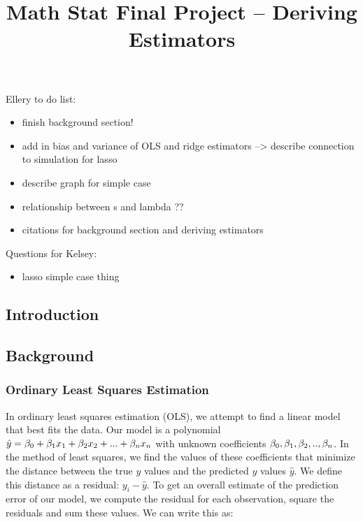 \documentclass[
]{article}
\title{Math Stat Final Project -- Deriving Estimators}
\author{}
\date{\vspace{-2.5em}}
\providecommand{\tightlist}{%
  \setlength{\itemsep}{0pt}\setlength{\parskip}{0pt}}
\begin{document}
\maketitle

Ellery to do list:

\begin{itemize}
\tightlist
\item
  finish background section!
\item
  add in bias and variance of OLS and ridge estimators --\textgreater{}
  describe connection to simulation for lasso
\item
  describe graph for simple case
\item
  relationship between s and lambda ??
\item
  citations for background section and deriving estimators
\end{itemize}

Questions for Kelsey:

\begin{itemize}
\tightlist
\item
  lasso simple case thing
\end{itemize}

\hypertarget{introduction}{%
\subsection{Introduction}\label{introduction}}

\hypertarget{background}{%
\subsection{Background}\label{background}}

\hypertarget{ordinary-least-squares-estimation}{%
\subsubsection{Ordinary Least Squares
Estimation}\label{ordinary-least-squares-estimation}}

In ordinary least squares estimation (OLS), we attempt to find a linear
model that best fits the data. Our model is a polynomial
\(\hat{y} = \beta_0 +\beta_1x_1 + \beta_2x_2 + \space ... \space + \beta_nx_n\)
with unknown coefficients
\(\beta_0, \space \beta_1, \space \beta_2, \space .., \space \beta_n\).
In the method of least squares, we find the values of these coefficients
that minimize the distance between the true \(y\) values and the
predicted \(y\) values \(\hat{y}\). We define this distance as a
residual: \(y_i- \hat{y}\). To get an overall estimate of the prediction
error of our model, we compute the residual for each observation, square
the residuals and sum these values. We can write this as:
\end{document}
